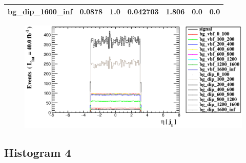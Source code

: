 \documentclass[a4paper, 10pt]{article}
\begin{document}
\begin{table}[H]
\begin{center}
\begin{tabular}{|m{23.0mm}|m{23.0mm}|m{18.0mm}|m{19.0mm}|m{19.0mm}|m{19.0mm}|m{19.0mm}|}
      \hline
      {\cellcolor{white}         bg\_dip\_1600\_inf}& {\cellcolor{white}         0.0878}& {\cellcolor{white}         1.0}& {\cellcolor{white}         0.042703}& {\cellcolor{white}         1.806}& {\cellcolor{green}         0.0}& {\cellcolor{green}         0.0}\\
\hline
    \end{tabular}
  \end{center}
\end{table}

\begin{figure}[H]
  \begin{center}
    \includegraphics[scale=0.45]{selection_2.eps}\\
\caption{   }
  \end{center}
\end{figure}
      \newpage
\subsection{ Histogram 4}
\end{document}
